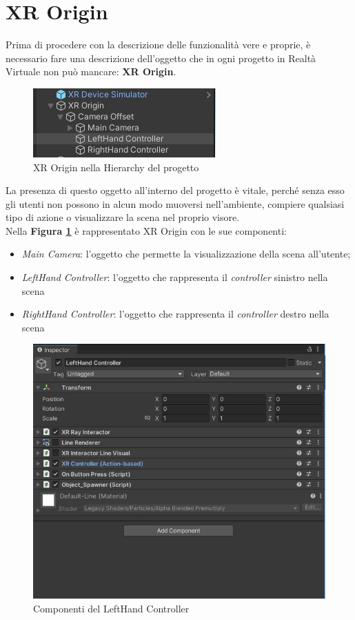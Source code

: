\section{XR Origin}
Prima di procedere con la descrizione delle funzionalità vere e proprie, è necessario fare una descrizione dell'oggetto che in ogni progetto in Realtà Virtuale non può mancare: \textbf{XR Origin}.
\begin{figure}[H]
    \centering
    \includegraphics[scale = 1]{Immagini/XROrigin.jpg}
    \caption{XR Origin nella Hierarchy del progetto}
    \label{fig:4.1}
\end{figure}
\hspace{-0.6cm}La presenza di questo oggetto all'interno del progetto è vitale, perché senza esso gli utenti non possono in alcun modo muoversi nell'ambiente, compiere qualsiasi tipo di azione o visualizzare la scena nel proprio visore. 
\\Nella \textbf{Figura \ref{fig:4.1}} è rappresentato XR Origin con le sue componenti:
\begin{itemize}
    \item \textit{Main Camera}: l'oggetto che permette la visualizzazione della scena all'utente;
    \item \textit{LeftHand Controller}: l'oggetto che rappresenta il \textit{controller} sinistro nella scena
    \item \textit{RightHand Controller}: l'oggetto che rappresenta il \textit{controller} destro nella scena
\end{itemize}
\begin{figure}[H]
    \centering
    \includegraphics[scale = 0.8]{Immagini/InspectorXRcontroller.jpg}
    \caption{Componenti del LeftHand Controller}
    \label{fig:4.2}
\end{figure}
